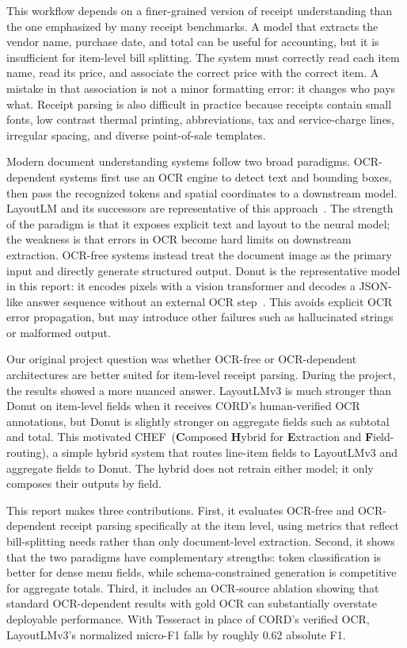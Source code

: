 \documentclass[9pt,twocolumn,twoside]{extarticle}
\newcommand{\cord}{\textsc{CORD}}
\newcommand{\chef}{\textsc{CHEF}}
\begin{document}
This workflow depends on a finer-grained version of receipt understanding than the one emphasized by many receipt benchmarks. A model that extracts the vendor name, purchase date, and total can be useful for accounting, but it is insufficient for item-level bill splitting. The system must correctly read each item name, read its price, and associate the correct price with the correct item. A mistake in that association is not a minor formatting error: it changes who pays what. Receipt parsing is also difficult in practice because receipts contain small fonts, low contrast thermal printing, abbreviations, tax and service-charge lines, irregular spacing, and diverse point-of-sale templates.

Modern document understanding systems follow two broad paradigms. OCR-dependent systems first use an OCR engine to detect text and bounding boxes, then pass the recognized tokens and spatial coordinates to a downstream model. LayoutLM and its successors are representative of this approach~\cite{xu2020layoutlm,xu2021layoutlmv2,huang2022layoutlmv3}. The strength of the paradigm is that it exposes explicit text and layout to the neural model; the weakness is that errors in OCR become hard limits on downstream extraction. OCR-free systems instead treat the document image as the primary input and directly generate structured output. Donut is the representative model in this report: it encodes pixels with a vision transformer and decodes a JSON-like answer sequence without an external OCR step~\cite{kim2022donut}. This avoids explicit OCR error propagation, but may introduce other failures such as hallucinated strings or malformed output.

Our original project question was whether OCR-free or OCR-dependent architectures are better suited for item-level receipt parsing. During the project, the results showed a more nuanced answer. LayoutLMv3 is much stronger than Donut on item-level fields when it receives \cord's human-verified OCR annotations, but Donut is slightly stronger on aggregate fields such as subtotal and total. This motivated \chef\ (\textbf{C}omposed \textbf{H}ybrid for \textbf{E}xtraction and \textbf{F}ield-routing), a simple hybrid system that routes line-item fields to LayoutLMv3 and aggregate fields to Donut. The hybrid does not retrain either model; it only composes their outputs by field.

This report makes three contributions. First, it evaluates OCR-free and OCR-dependent receipt parsing specifically at the item level, using metrics that reflect bill-splitting needs rather than only document-level extraction. Second, it shows that the two paradigms have complementary strengths: token classification is better for dense menu fields, while schema-constrained generation is competitive for aggregate totals. Third, it includes an OCR-source ablation showing that standard OCR-dependent results with gold OCR can substantially overstate deployable performance. With Tesseract in place of \cord's verified OCR, LayoutLMv3's normalized micro-F1 falls by roughly 0.62 absolute F1.
\end{document}
